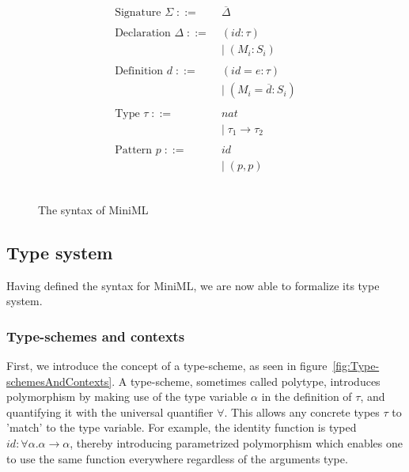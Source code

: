 \documentclass[10pt,a4paper]{report}
\begin{document}
\begin{figure}[!htb]
\begin{align*}
\begin{aligned}
\text{Signature } \Sigma \; ::=\; & \overline{\Delta}\\
\\
\text{Declaration } \Delta \; ::=\; & (\mathit{id}:\tau)\\
& | \; (\mathit{M_{i}}:S_{i})\\
\\
\text{Definition } d \; ::= \; &(\mathit{id}=e:\tau)\\
& | \; (\mathit{M_{i}} = \overline{d} : S_{i}) \\
\\
\text{Type }\tau \; ::= \; &nat \\
&| \; \tau_{1} \rightarrow \tau_{2} \\
\\
\text{Pattern }p \; ::= \; & \mathit{id} \\
&| \; (p,p)\\
\\
\\
\end{aligned}
\end{align*}
\caption{The syntax of MiniML}
\label{fig:Syntax}
\end{figure}



\subsection{Type system}
Having defined the syntax for \mbox{MiniML}, we are now able to formalize its type system.

\subsubsection{Type-schemes and contexts}
First, we introduce the concept of a type-scheme, as seen in figure~\ref{fig:Type-schemesAndContexts}. A type-scheme, sometimes called polytype, introduces polymorphism by making use of the type variable $\alpha$ in the definition of $\tau$, and quantifying it with the universal quantifier $\forall$. This allows any concrete types $\tau$ to 'match' to the type variable. For example, the identity function  is typed $id:\forall \alpha. \alpha \rightarrow \alpha$, thereby introducing parametrized polymorphism which enables one to use the same  function everywhere regardless of the arguments type.
\end{document}
